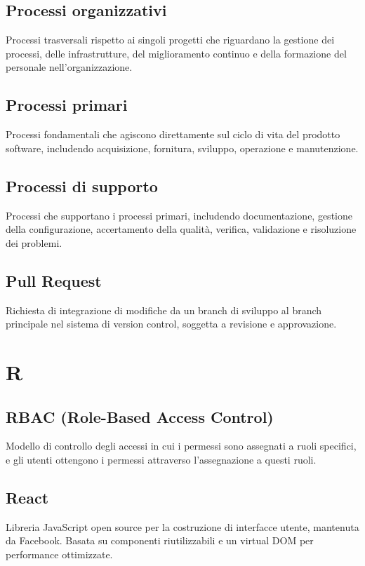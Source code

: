 \documentclass[a4paper,11pt]{article}
\begin{document}
\subsection{Processi organizzativi}
Processi trasversali rispetto ai singoli progetti che riguardano la gestione dei processi, delle infrastrutture, del miglioramento continuo e della formazione del personale nell'organizzazione.

\subsection{Processi primari}
Processi fondamentali che agiscono direttamente sul ciclo di vita del prodotto software, includendo acquisizione, fornitura, sviluppo, operazione e manutenzione.

\subsection{Processi di supporto}
Processi che supportano i processi primari, includendo documentazione, gestione della configurazione, accertamento della qualità, verifica, validazione e risoluzione dei problemi.

\subsection{Pull Request}
Richiesta di integrazione di modifiche da un branch di sviluppo al branch principale nel sistema di version control, soggetta a revisione e approvazione.

\newpage
\section{R}

\subsection{RBAC (Role-Based Access Control)}
Modello di controllo degli accessi in cui i permessi sono assegnati a ruoli specifici, e gli utenti ottengono i permessi attraverso l'assegnazione a questi ruoli.

\subsection{React}
Libreria JavaScript open source per la costruzione di interfacce utente, mantenuta da Facebook. Basata su componenti riutilizzabili e un virtual DOM per performance ottimizzate.
\end{document}
